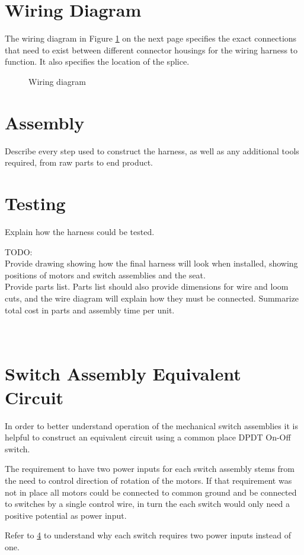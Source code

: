 \documentclass[12pt,letterpaper]{article}
\begin{document}

\section{Wiring Diagram}
The wiring diagram in Figure \ref{fig:wiringdiagram} on the next page specifies the exact connections that need to exist between different connector housings for the wiring harness to function. It also specifies the location of the splice. 

\nopagebreak 
\begin{figure}[h]\label{fig:wiringdiagram}
\centering
\def\svgwidth{\columnwidth}

\caption{Wiring diagram}
\end{figure}
\clearpage


\section{Assembly}
Describe every step used to construct the harness, as well as any additional tools required, from raw parts to end product.

\section{Testing}
Explain how the harness could be tested.

TODO:\\


Provide drawing showing how the final harness will look when installed, showing positions of motors and switch assemblies and the seat.\\
Provide parts list. Parts list should also provide dimensions for wire and loom cuts, and the wire diagram will explain how they must be connected.
Summarize total cost in parts and assembly time per unit.



\appendix
\section{\\Switch Assembly Equivalent Circuit} \label{appendixa}
In order to better understand operation of the mechanical switch assemblies it is helpful to construct an equivalent circuit using a common place DPDT On-Off switch.

The requirement to have two power inputs for each switch assembly stems from the need to control direction of rotation of the motors. If that requirement was not in place all motors could be connected to common ground and be connected to switches by a single control wire, in turn the each switch would only need a positive potential as power input.

Refer to \ref{appendixa} to understand why each switch requires two power inputs instead of one.
\end{document}
